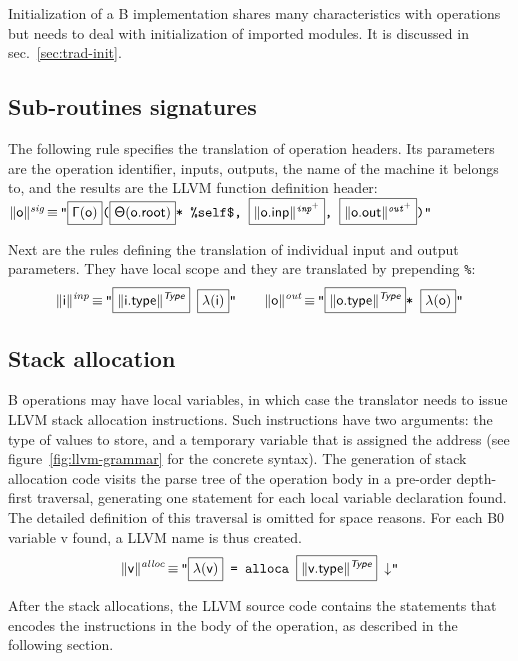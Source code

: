 \documentclass{article}
\newcommand{\trad}[2]{\ensuremath{\lVert \textsf{#1} \rVert^{\textit{#2}}}}
\newcommand{\nl}[0]{\ensuremath{\downarrow}}
\DeclareMathOperator{\isdef}{\equiv}
\newcommand{\llvm}[1]{\texttt{#1}}
\newcommand{\B}[1]{\textsf{#1}}
\newcommand{\ListOf}[1]{$\mbox{#1}^+$}
\newcommand{\PH}[1]{\framebox{$#1$}}
\newcommand{\Global}[0]{\ensuremath{\sf\Gamma}}
\newcommand{\local}[0]{\ensuremath{\sf\lambda}}
\newcommand{\state}[0]{\ensuremath{\sf\Theta}}
\newcommand{\self}[0]{\llvm{\%self\$}}
\begin{document}
Initialization of a B implementation shares many characteristics with operations
but needs to deal with initialization of imported modules. It is discussed in
sec.~\ref{sec:trad-init}.

\subsection{Sub-routines signatures}
\label{sec:trad-header}

The following rule specifies the translation of operation headers. Its
parameters are the operation identifier, inputs, outputs, the name of the
machine it belongs to, and the results are the LLVM function definition
header: \\
\noindent$\trad{\B{o}}{sig} \isdef \llvm{"\PH{\Global(\B{o})}(\PH{\state(\B{o.root})}* \self, \PH{\trad{\B{o.inp}}{\ListOf{inp}}}, \PH{\trad{\B{o.out}}{\ListOf{out}}})"}$

Next are the rules defining the translation of individual input and output
parameters. They have local scope and they are translated by prepending
\llvm{\%}:
\begin{align*}
  \trad{i}{inp} \isdef
  \llvm{"\PH{\trad{i.type}{\B{Type}}} \PH{\local(\B{i})}"} \quad \quad
  \trad{o}{out} \isdef
  \llvm{"\PH{\trad{o.type}{\B{Type}}}* \PH{\local(\B{o})}"}
\end{align*}

\subsection{Stack allocation}
\label{sec:trad-alloc}

B operations may have local variables, in which case the translator needs to
issue LLVM stack allocation instructions. Such instructions have two arguments:
the type of values to store, and a temporary variable that is assigned the
address (see figure~\ref{fig:llvm-grammar} for the concrete syntax). The
generation of stack allocation code visits the parse tree of the operation body
in a pre-order depth-first traversal, generating one statement for each local
variable declaration found. The detailed definition of this traversal is omitted
for space reasons. For each B0 variable \B{v} found, a LLVM name is thus
created.
\begin{align*}
  \trad{v}{alloc} \isdef
  \llvm{"\PH{\local(\B{v})} = alloca \PH{\trad{v.type}{\B{Type}}} \nl"}
\end{align*}

After the stack allocations, the LLVM source code contains the statements that
encodes the instructions in the body of the operation, as described in the
following section.
\end{document}

